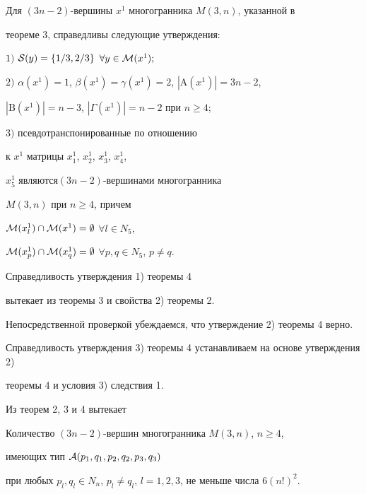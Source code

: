 \begin{thm}


Для $(3n-2)$-вершины $x^1$ многогранника $M(3,n)$, указанной в


теореме $3$, справедливы следующие утверждения\/${:}$





$1)$ ${\cal S}(y)=\{1/3,2/3\}$ $\forall y\in{\cal M}(x^1);$





$2)$ $\alpha(x^1)=1$, $\beta(x^1)=\gamma(x^1)=2$, $|\mathrm A(x^1)|=3n-2$,


$|\mathrm B(x^1)|=n-3$, $|\Gamma(x^1)|=n-2$ при $n\ge 4;$





$3)$ псевдотранспонированные по отношению 


к $x^1$ матрицы $x_1^1$, $x_2^1$, $x_3^1$, $x_4^1$,


$x_5^1$ являются\linebreak $(3n-2)$-вершинами многогранника


$M(3,n)$ при $n\ge 4$, причем


${\cal M} (x_l^1)\cap{\cal M} (x^1)=\emptyset$ $\forall l\in N_5$,\linebreak


${\cal M}


(x_p^1)\cap{\cal M} (x_q^1)=\emptyset$ $\forall p,q\in N_5$, $p\neq q$.


\end{thm}





Справедливость утверждения 1) теоремы 4 


вытекает из теоремы 3 и свойства 2) теоремы 2.


Непосредственной проверкой убеждаемся, что утверждение 2) теоремы 4 верно.


Справедливость утверждения 3) теоремы 4 устанавливаем на основе утверждения 2)


теоремы 4 и условия 3) следствия 1.





Из теорем 2, 3 и 4 вытекает





\begin{cor}


Количество $(3n-2)$-вершин многогранника $M(3,n)$, $n\geq 4$,


имеющих тип ${\cal A}(p_1,q_1,p_2,q_2,p_3,q_3)$


при любых $p_l,q_l\in N_n$, $p_l\ne


q_l$, $l=1,2,3$, не меньше числа $6(n!)^2$.


\end{cor}





